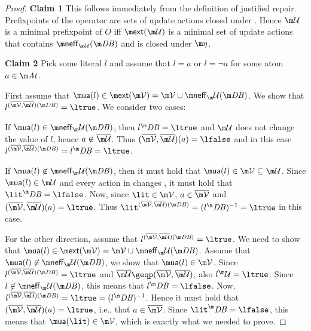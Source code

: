 \begin{proof}
% 

\textbf{Claim 1} This follows immediately from the definition of justified repair. Prefixpoints of the \closure operator are sets of update actions closed under \aics. Hence $\UU$ is a minimal prefixpoint of $O$ iff $\ext(\UU)$ is a minimal set of update actions that contains $\neff_{\UU}(\db)$ and is closed under $\aics$. 





\textbf{Claim 2} Pick some literal $l$ and assume that $l=a$ or $l=\lnot a$ for some atom $a\in \atoms$.

First assume that $\actof(l)\in\ext(\VV)=\VV\cup\neff_\UU(\db)$. We show that $l^{(\overline \VV, \overline \UU)(\db)} = \ltrue$. 
 We consider two cases:
\begin{compactitem}
 \item If $\actof(l)\in \neff_\UU(\db)$, then $l^\db = \ltrue$ and $\UU$ does not change the value of $l$, hence $a\not\in\overline\UU$. Thus $(\overline \VV,\overline \UU)(a)=\lfalse$ and in this case $l^{(\overline \VV,\overline \UU)(\db)} = l^\db = \ltrue$. 
 \item If $\actof(l)\not\in \neff_\UU(\db)$, then it must hold that $\actof(l) \in \VV\subseteq \UU$. Since $\actof(l)\in \UU$ and every action in \UU changes \db, it must hold that $\lit^\db=\lfalse$. Now, since $\lit \in \VV$, $a\in \overline \VV$ and $(\overline \VV, \overline \UU) (a) = \ltrue$. Thus $\lit^{(\overline\VV,\overline\UU)(\db)} = (l^\db)^{-1} = \ltrue$ in this case. 
\end{compactitem}
For the other direction, assume that $l^{(\overline \VV, \overline \UU)(\db)} = \ltrue$. We need to show that $\actof(l)\in\ext(\VV)=\VV\cup\neff_\UU(\db)$. Assume that $\actof(l)\not\in \neff_\UU(\db)$, we show that $\actof(l)\in \VV$. 
Since $l^{(\overline \VV, \overline \UU)(\db)} = \ltrue$ and $\overline\UU\geqp (\overline\VV,\overline\UU)$, also $l^\UU=\ltrue$. Since $l\not\in \neff_\UU(\db)$, this means that $l^\db=\lfalse$.
Now,
$l^{(\overline \VV, \overline \UU)(\db)} = \ltrue = (l^\db)^{-1}$. Hence it must hold that $(\overline \VV,\overline \UU)(a) = \ltrue$, i.e., that $a\in \overline \VV$. Since $\lit^\db = \lfalse$, this means that $  \actof{(\lit)}\in \VV$, which is exactly what we needed to prove. 



\end{proof}
